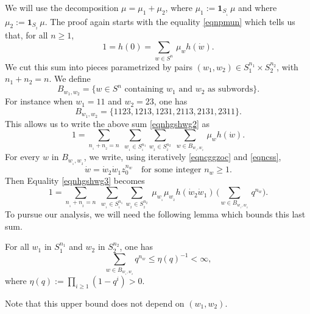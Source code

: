 We will use the decomposition $\mu=\mu_1+\mu_2$, where $\mu_1:=\mathbf{1}_{S_{_1}}\,\mu$ and
where \hbox{$\mu_2:=\mathbf{1}_{S_{_2}}\,\mu$}.
The proof again starts with the equality \eqref{eqnpmun}
which tells us that, for all $n\geq 1$,
\begin{equation}
\label{eqnhgshwg2}
1=h(0)=
\sum_{w\in S^n}\, \mu_w h(\dot{w}).
\end{equation}
We cut this sum into pieces
parametrized by pairs $(w_1,w_2)\!\in\!S_1^{n_1}\!\times\!S_2^{n_2}$,
with \hbox{$n_1\!+\!n_2\!=\!n$}. We define
\[
B_{w_1,w_2}=\{ w\in S^n \text{ containing $w_1$ and $w_2$ as subwords}\}.
\]
For instance when
$w_1=11$ and $w_2=23$,
one has
\[
B_{w_1,w_2}=\{1123,1213,1231,2113,2131,2311\}.
\]
This allows us to write the above sum \eqref{eqnhgshwg2} as
\begin{equation}
\label{eqnhgshwg3}
1=
\sum_{n_{_1}+n_{_2}=n}\;
\sum_{w_{_1}\in S_{_1}^{n_1}}
\sum_{w_{_2}\in S_{_2}^{n_2}}\;
\sum_{w\in B_{w_{_1}\!,w_{_2}}}\, \mu_w h(\dot{w}).
\end{equation}
For every $w$ in $B_{w_{_1},w_{_2}}$, we write, using iteratively \eqref{eqncggzoc}
and \eqref{eqncss},
\begin{equation}
\label{eqngwgwgw}
\dot{w}=\dot{w}_{2}\dot{w}_{1}z_0^{n_w}
\quad\text{for some integer $n_w\geq 1$}.
\end{equation}
Then Equality \eqref{eqnhgshwg3} becomes
\begin{equation}
\label{eqnhgshwg4}
1=
\sum_{n_{_1}+n_{_2}=n}\;
\sum_{w_{_1}\in S_{_1}^{n_1}}
\sum_{w_{_2}\in S_{_2}^{n_2}}\;
\mu_{w_{_1}} \mu_{w_{_2}} h(\dot{w}_{2}\dot{w}_{1})\,
\biggl(\sum_{w\in B_{w_{_1}\!,w_{_2}}}\,q^{n_w}\biggr).
\end{equation}
To pursue our analysis, we will need the following lemma which
bounds this last sum.

\begin{Lem}
\label{lemsumbww}
For all $w_1$ in $S_1^{n_1}$ and $w_2$ in $S_2^{n_2}$, one has
\begin{equation}
\label{eqnswbwbw}
\sum_{w\in B_{w_{_1}\!,w_{_2}}} q^{n_w}
\leq
\eta(q)^{-1}<\infty,
\end{equation}
where $\eta(q):=\prod\limits_{i\geq 1}(1-q^i)>0$.
\end{Lem}

Note that this upper bound does not depend on $(w_1,w_2)$.

